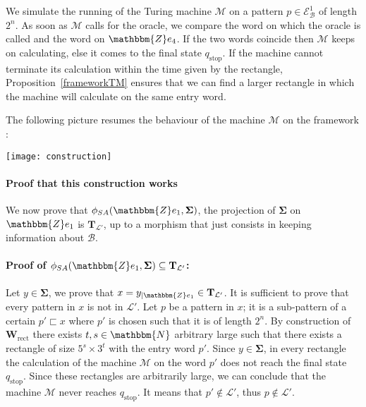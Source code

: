 \documentclass[proceedings]{stacs}
\theoremstyle{plain}\newtheorem{satz}[thm]{Satz}
\theoremstyle{definition}\newtheorem{crucial}[thm]{Crucial Definition}
\newcommand{\Z}{\mathbbm{Z}}
\newcommand{\N}{\mathbbm{N}}
\newcommand{\B}{\mathcal{B}}
\newcommand{\E}{\mathcal{E}}
\newcommand{\T}{\mathbf{T}}
\newcommand{\Tfinal}{\mathbf{\Sigma}}
\newcommand{\W}{\mathbf{W}}
\newcommand{\TM}{\mathcal{M}}
\newcommand{\Lang}{\mathcal{L}}
\begin{document}
We simulate the running of the Turing machine $\TM$ on a pattern $p\in\E^1_{\B}$ of length $2^n$. As soon as $\TM$ calls for the oracle, we compare the word on which the oracle is called and the word on $\Z e_4$. If the two words coincide then $\TM$ keeps on calculating, else it comes to the final state $q_{\textrm{stop}}$. If the machine cannot terminate its calculation within the time given by the rectangle, Proposition~\ref{frameworkTM} ensures that we can find a larger rectangle in which the machine will calculate on the same entry word.

\vspace{0,4cm}
The following picture resumes the behaviour of the machine $\TM$ on the framework :

\begin{center}
\texttt{[image: construction]}
\end{center}

\paragraph{\textbf{Proof that this construction works}}
We now prove that $\phi_{SA}(\Z e_1,\Tfinal)$, the projection of $\Tfinal$ on $\mathbbm{Z}e_1$ is $\T_{\Lang'}$, up to a morphism that just consists in keeping information about $\mathcal{B}$.


\paragraph{Proof of $\phi_{SA}(\Z e_1,\Tfinal) \subseteq \T_{\Lang'}$:}

Let $y\in\Tfinal$, we prove that $x=y_{|\Z e_1}\in \T_{\Lang'}$. It is sufficient to prove that every pattern in $x$ is not in $\Lang'$. Let $p$ be a pattern in $x$; it is a sub-pattern of a certain $p'\sqsubset x$ where $p'$ is chosen such that it is of length $2^n$. By construction of $\W_{\textrm{rect}}$ there exists $t,s\in\N$ arbitrary large such that there exists a rectangle of size $5^s\times3^t$ with the entry word $p'$. Since $y\in\Tfinal$, in every rectangle the calculation of the machine $\TM$ on the word $p'$ does not reach the final state $q_{\textrm{stop}}$. Since these rectangles are arbitrarily large, we can conclude that the machine $\TM$ never reaches $q_{\textrm{stop}}$. It means that $p'\notin \Lang'$, thus $p\notin \Lang'$.
\end{document}
